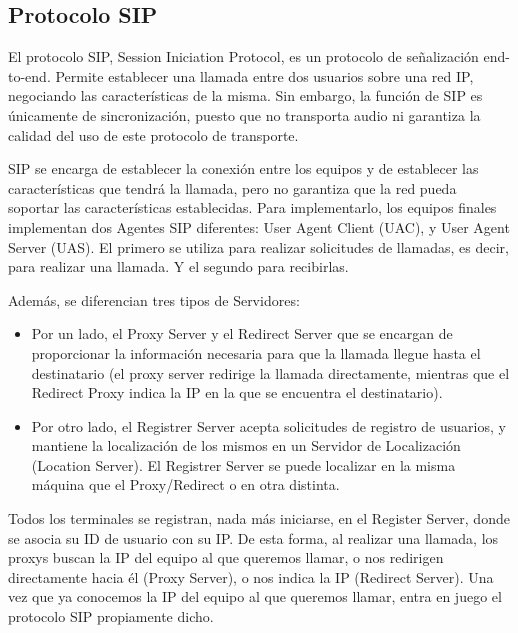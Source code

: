 \documentclass[a4paper]{article}
\begin{document}
\subsection{Protocolo SIP}
El protocolo SIP, Session Iniciation Protocol, es un protocolo de señalización end-to-end. Permite establecer una llamada entre dos usuarios sobre una red IP, negociando las características de la misma. Sin embargo, la función de SIP es únicamente de sincronización, puesto que no transporta audio ni garantiza la calidad del uso de este protocolo de transporte. 

\medskip
\noindent SIP se encarga de establecer la conexión entre los equipos y de establecer las características que tendrá la llamada, pero no garantiza que la red pueda soportar las características establecidas.
Para implementarlo, los equipos finales implementan dos Agentes SIP diferentes: User Agent Client (UAC), y User Agent Server (UAS). El primero se utiliza para realizar solicitudes de llamadas, es decir, para realizar una llamada. Y el segundo para recibirlas.

\medskip
\noindent
Además, se diferencian tres tipos de Servidores:

\begin{itemize}
    \item Por un lado, el Proxy Server y el Redirect Server que se encargan de proporcionar la información necesaria para que la llamada llegue hasta el destinatario (el proxy server redirige la llamada directamente, mientras que el Redirect Proxy indica la IP en la que se encuentra el destinatario).
    
    \item Por otro lado, el Registrer Server acepta solicitudes de registro de usuarios, y mantiene la localización de los mismos en un Servidor de Localización (Location Server). El Registrer Server se puede localizar en la misma máquina que el Proxy/Redirect o en otra distinta. 
    
\end{itemize}  

\noindent
Todos los terminales se registran, nada más iniciarse, en el Register Server, donde se asocia su ID de usuario con su IP. De esta forma, al realizar una llamada, los proxys buscan la IP del equipo al que queremos llamar, o nos redirigen directamente hacia él (Proxy Server), o nos indica la IP (Redirect Server).
Una vez que ya conocemos la IP del equipo al que queremos llamar, entra en juego el protocolo SIP propiamente dicho. 
\end{document}

